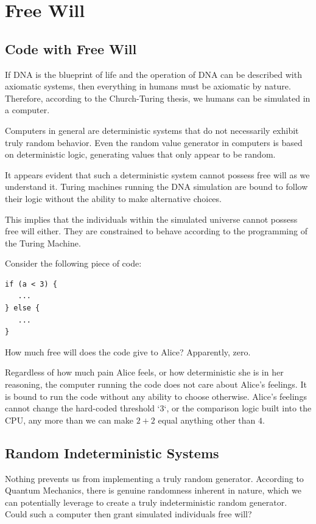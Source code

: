 \chapter{Free Will}
\label{chap:free-will}

\section{Code with Free Will}
  
If DNA is the blueprint of life and the operation of DNA can be
described with axiomatic systems, then everything in humans must be
axiomatic by nature. Therefore, according to the Church-Turing thesis,
we humans can be simulated in a computer.
  
Computers in general are deterministic systems that do not necessarily exhibit
truly random behavior. Even the random value generator in computers is based
on deterministic logic, generating values that only appear to be random. 
  
It appears evident that such a deterministic system cannot possess
free will as we understand it. Turing machines running the DNA
simulation are bound to follow their logic without the ability to
make alternative choices. 
  
This implies that the individuals within the simulated universe
cannot possess free will either. They are constrained to behave
according to the programming of the Turing Machine. 


Consider the following piece of code:

\begin{verbatim}
if (a < 3) {
   ...
} else {
   ...
}
\end{verbatim}

How much free will does the code give to Alice? Apparently, zero.

Regardless of how much pain Alice feels, or how deterministic she is in her reasoning,
the computer running the code does not care about Alice's feelings. It is bound
to run the code without any ability to choose otherwise. Alice's feelings cannot
change the hard-coded threshold `3`, or the comparison logic built into the CPU, any
more than we can make $2+2$ equal anything other than $4$.

\section{Random Indeterministic Systems}

Nothing prevents us from implementing a truly random generator. According to Quantum Mechanics,
there is genuine randomness inherent in nature, which we can
potentially leverage to create a truly indeterministic random generator. Could such a computer then grant simulated individuals free will? 
  
